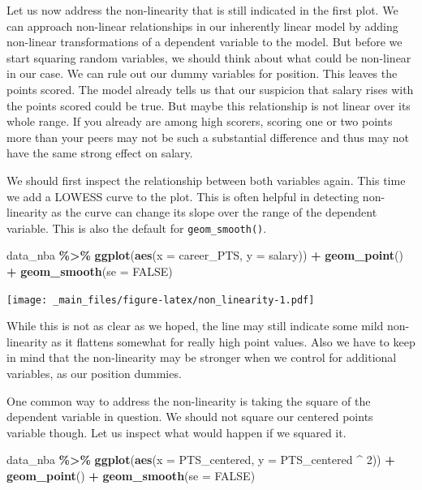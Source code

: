 \documentclass[
]{book}
\newenvironment{Shaded}{\begin{snugshade}}{\end{snugshade}}
\newcommand{\AttributeTok}[1]{\textcolor[rgb]{0.13,0.29,0.53}{#1}}
\newcommand{\ConstantTok}[1]{\textcolor[rgb]{0.56,0.35,0.01}{#1}}
\newcommand{\DecValTok}[1]{\textcolor[rgb]{0.00,0.00,0.81}{#1}}
\newcommand{\FunctionTok}[1]{\textcolor[rgb]{0.13,0.29,0.53}{\textbf{#1}}}
\newcommand{\NormalTok}[1]{#1}
\newcommand{\SpecialCharTok}[1]{\textcolor[rgb]{0.81,0.36,0.00}{\textbf{#1}}}
\begin{document}
Let us now address the non-linearity that is still indicated in the first plot.
We can approach non-linear relationships in our inherently linear model by
adding non-linear transformations of a dependent variable to the model. But
before we start squaring random variables, we should think about what could be
non-linear in our case. We can rule out our dummy variables for position. This
leaves the points scored. The model already tells us that our suspicion that
salary rises with the points scored could be true. But maybe this relationship
is not linear over its whole range. If you already are among high scorers,
scoring one or two points more than your peers may not be such a substantial
difference and thus may not have the same strong effect on salary.

We should first inspect the relationship between both variables again. This time
we add a LOWESS curve to the plot. This is often helpful in detecting
non-linearity as the curve can change its slope over the range of the dependent
variable. This is also the default for \texttt{geom\_smooth()}.

\begin{Shaded}
\begin{Highlighting}[]
\NormalTok{data\_nba }\SpecialCharTok{\%\textgreater{}\%} 
  \FunctionTok{ggplot}\NormalTok{(}\FunctionTok{aes}\NormalTok{(}\AttributeTok{x =}\NormalTok{ career\_PTS, }\AttributeTok{y =}\NormalTok{ salary)) }\SpecialCharTok{+}
  \FunctionTok{geom\_point}\NormalTok{() }\SpecialCharTok{+}
  \FunctionTok{geom\_smooth}\NormalTok{(}\AttributeTok{se =} \ConstantTok{FALSE}\NormalTok{)}
\end{Highlighting}
\end{Shaded}

\texttt{[image: \_main\_files/figure-latex/non\_linearity-1.pdf]}

While this is not as clear as we hoped, the line may still indicate some mild
non-linearity as it flattens somewhat for really high point values. Also we have
to keep in mind that the non-linearity may be stronger when we control for
additional variables, as our position dummies.

One common way to address the non-linearity is taking the square of the
dependent variable in question. We should not square our centered points
variable though. Let us inspect what would happen if we squared it.

\begin{Shaded}
\begin{Highlighting}[]
\NormalTok{data\_nba }\SpecialCharTok{\%\textgreater{}\%} 
  \FunctionTok{ggplot}\NormalTok{(}\FunctionTok{aes}\NormalTok{(}\AttributeTok{x =}\NormalTok{ PTS\_centered, }\AttributeTok{y =}\NormalTok{ PTS\_centered }\SpecialCharTok{\^{}} \DecValTok{2}\NormalTok{)) }\SpecialCharTok{+}
  \FunctionTok{geom\_point}\NormalTok{() }\SpecialCharTok{+}
  \FunctionTok{geom\_smooth}\NormalTok{(}\AttributeTok{se =} \ConstantTok{FALSE}\NormalTok{)}
\end{Highlighting}
\end{Shaded}
\end{document}
